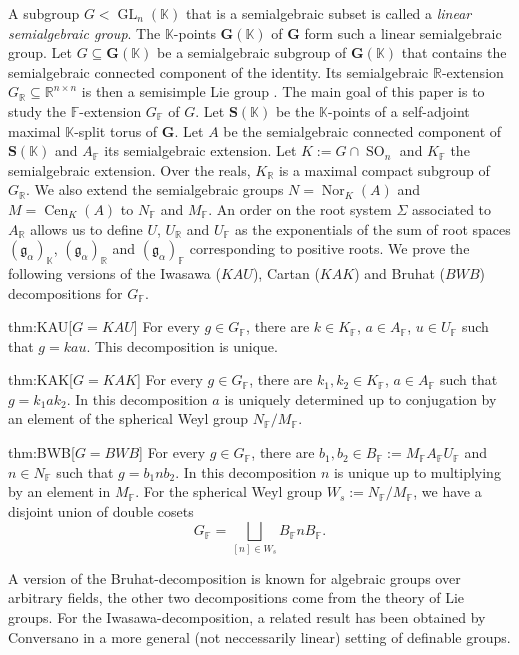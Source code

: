 \documentclass[12pt]{amsart}
\newcommand{\F}{\mathbb{F} }
\newcommand{\R}{\mathbb{R} }
\newcommand{\K}{\mathbb{K}}
\newcommand{\frakg}{\mathfrak{g}}
\newcommand{\bG}{\mathbf{G}}
\newcommand{\bS}{\mathbf{S}}
\numberwithin{equation}{section}
\theoremstyle{remark} %
\begin{document}
	A subgroup $G < \operatorname{GL}_n(\K)$ that is a semialgebraic subset is called a \emph{linear semialgebraic group}. The $\K$-points $\bG(\K)$ of $\bG$ form such a linear semialgebraic group. 
	Let $G \subseteq \bG(\K)$ be a semialgebraic subgroup of $\bG(\K)$ that contains the semialgebraic connected component of the identity. Its semialgebraic $\R$-extension $G_\R \subseteq \R^{n \times n}$ is then a semisimple Lie group \cite{Pil88}. The main goal of this paper is to study the $\F$-extension $G_\F$ of $G$. Let $\bS(\K)$ be the $\K$-points of a self-adjoint maximal $\K$-split torus of $\bG$. Let $A$ be the semialgebraic connected component of $\bS(\K)$ and $A_\F$ its semialgebraic extension. Let $K := G \cap \operatorname{SO}_n$ and $K_\F$ the semialgebraic extension. Over the reals, $K_\R$ is a maximal compact subgroup of $G_\R$. We also extend the semialgebraic groups $N = \operatorname{Nor}_{K}(A)$ and $M = \operatorname{Cen}_{K}(A)$ to $N_\F$ and $M_\F$. An order on the root system $\Sigma$ associated to $A_\R$ allows us to define $U$, $U_\R$ and $U_\F$ as the exponentials of the sum of root spaces $(\frakg_\alpha)_\K$, $(\frakg_\alpha)_\R$ and $(\frakg_\alpha)_\F$ corresponding to positive roots. We prove the following versions of the Iwasawa ($KAU$), Cartan ($KAK$) and Bruhat ($BWB$) decompositions for $G_\F$. 
	 \begin{reptheorem}{thm:KAU}[$G=KAU$]
	 	For every $g \in G_\F$, there are $k \in K_\F$, $a \in A_\F$, $u \in U_\F$ such that $g = kau$. This decomposition is unique.
	 \end{reptheorem} 
	 \begin{reptheorem}{thm:KAK}[$G=KAK$]
	 	For every $g \in G_\F$, there are $k_1,k_2 \in K_\F$, $a \in A_\F$ such that $g = k_1 a k_2$.
	 	In this decomposition $a$ is uniquely determined up to conjugation by an element of the spherical Weyl group $N_{\F}/M_{\F}$.
	 \end{reptheorem}
	 \begin{reptheorem}{thm:BWB}[$G=BWB$]
	 	For every $g \in G_\F$, there are $b_1,b_2 \in B_\F := M_\F A_\F U_\F$ and $n\in N_\F$ such that $g = b_1 n b_2$. In this decomposition $n$ is unique up to multiplying by an element in $M_{\F}$. For the spherical Weyl group $W_s := N_\F/M_\F$, we have a disjoint union of double cosets
	 	$$
	 	G_{\F} =  \bigsqcup_{[n] \in W_s} B_{\F}nB_{\F}.
	 	$$ 
	 \end{reptheorem}
	 A version of the Bruhat-decomposition is known for algebraic groups \cite[Theorem 14.11]{Bor} over arbitrary fields, the other two decompositions come from the theory of Lie groups.
	 For the Iwasawa-decomposition, a related result has been obtained by Conversano \cite[Theorem 2.1]{Con14} in a more general (not neccessarily linear) setting of definable groups. 
	 
\end{document}
